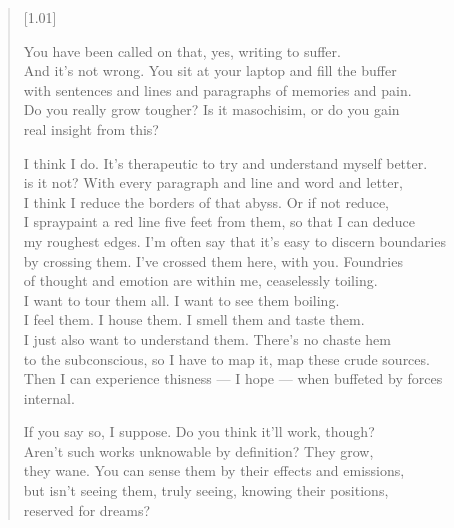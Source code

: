 \begin{verse}[1.01\textwidth]
  \begin{ally}
    \noindent You have been called on that, yes, writing to suffer.\\
  \noindent And it's not wrong. You sit at your laptop and fill the buffer\\
  \noindent with sentences and lines and paragraphs of memories and pain.\\
  \noindent Do you really grow tougher? Is it masochisim, or do you gain\\
  \noindent real insight from this?
\end{ally}

  I think I do. It's therapeutic to try and understand myself better.\\
  is it not? With every paragraph and line and word and letter,\\
  I think I reduce the borders of that abyss. Or if not reduce,\\
  I spraypaint a red line five feet from them, so that I can deduce\\
  my roughest edges. I'm often say that it's easy to discern boundaries\\
  by crossing them. I've crossed them here, with you. Foundries\\
  of thought and emotion are within me, ceaselessly toiling.\\
  I want to tour them all. I want to see them boiling.\\
  I feel them. I house them. I smell them and taste them.\\
  I just also want to understand them. There's no chaste hem\\
  to the subconscious, so I have to map it, map these crude sources.\\
  Then I can experience thisness --- I hope --- when buffeted by forces\\
  internal.

  \begin{ally}
    \noindent If you say so, I suppose. Do you think it'll work, though?\\
  \noindent Aren't such works unknowable by definition? They grow,\\
  \noindent they wane. You can sense them by their effects and emissions,\\
  \noindent but isn't seeing them, truly seeing, knowing their positions,\\
  \noindent reserved for dreams?
\end{ally}
\end{verse}
\newpage

